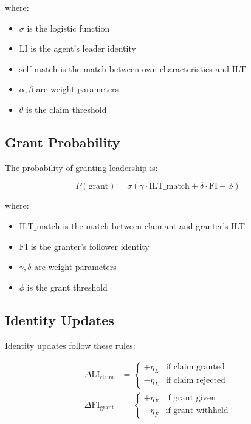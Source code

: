 \documentclass[12pt]{article}
\begin{document}
where:
\begin{itemize}
    \item $\sigma$ is the logistic function
    \item $\text{LI}$ is the agent's leader identity
    \item $\text{self\_match}$ is the match between own characteristics and ILT
    \item $\alpha, \beta$ are weight parameters
    \item $\theta$ is the claim threshold
\end{itemize}

\subsection{Grant Probability}
The probability of granting leadership is:

\begin{equation}
P(\text{grant}) = \sigma(\gamma \cdot \text{ILT\_match} + \delta \cdot \text{FI} - \phi)
\end{equation}

where:
\begin{itemize}
    \item $\text{ILT\_match}$ is the match between claimant and granter's ILT
    \item $\text{FI}$ is the granter's follower identity
    \item $\gamma, \delta$ are weight parameters
    \item $\phi$ is the grant threshold
\end{itemize}

\subsection{Identity Updates}
Identity updates follow these rules:

\begin{align*}
\Delta \text{LI}_{\text{claim}} &= \begin{cases}
    +\eta_L & \text{if claim granted}\\
    -\eta_L & \text{if claim rejected}
\end{cases}\\
\Delta \text{FI}_{\text{grant}} &= \begin{cases}
    +\eta_F & \text{if grant given}\\
    -\eta_F & \text{if grant withheld}
\end{cases}
\end{align*}
\end{document}

